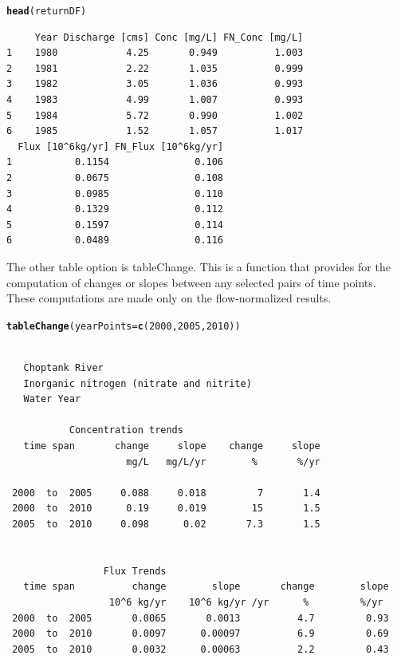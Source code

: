 \documentclass[a4paper,11pt]{article}\usepackage[]{graphicx}\usepackage[]{color}
\makeatletter
\newcommand{\hlnum}[1]{\textcolor[rgb]{0.686,0.059,0.569}{#1}}%
\newcommand{\hlstd}[1]{\textcolor[rgb]{0.345,0.345,0.345}{#1}}%
\newcommand{\hlkwc}[1]{\textcolor[rgb]{0.333,0.667,0.333}{#1}}%
\newcommand{\hlkwd}[1]{\textcolor[rgb]{0.737,0.353,0.396}{\textbf{#1}}}%
\newenvironment{kframe}{%
 \def\at@end@of@kframe{}%
 \ifinner\ifhmode%
  \def\at@end@of@kframe{\end{minipage}}%
  \begin{minipage}{\columnwidth}%
 \fi\fi%
 \def\FrameCommand##1{\hskip\@totalleftmargin \hskip-\fboxsep
 \colorbox{shadecolor}{##1}\hskip-\fboxsep
     \hskip-\linewidth \hskip-\@totalleftmargin \hskip\columnwidth}%
 \MakeFramed {\advance\hsize-\width
   \@totalleftmargin\z@ \linewidth\hsize
   \@setminipage}}%
 {\par\unskip\endMakeFramed%
 \at@end@of@kframe}
\newenvironment{knitrout}{}{} %
\makeatother
\begin{document}
\begin{knitrout}
\color{fgcolor}\begin{kframe}
\begin{alltt}
\hlkwd{head}\hlstd{(returnDF)}
\end{alltt}
\begin{verbatim}
     Year Discharge [cms] Conc [mg/L] FN_Conc [mg/L]
1    1980            4.25       0.949          1.003
2    1981            2.22       1.035          0.999
3    1982            3.05       1.036          0.993
4    1983            4.99       1.007          0.993
5    1984            5.72       0.990          1.002
6    1985            1.52       1.057          1.017
  Flux [10^6kg/yr] FN_Flux [10^6kg/yr]
1           0.1154               0.106
2           0.0675               0.108
3           0.0985               0.110
4           0.1329               0.112
5           0.1597               0.114
6           0.0489               0.116
\end{verbatim}
\end{kframe}
\end{knitrout}



The other table option is tableChange. This is a function that provides for the computation of changes or slopes between any selected pairs of time points.  These computations are made only on the flow-normalized results.

\begin{knitrout}
\color{fgcolor}\begin{kframe}
\begin{alltt}
\hlkwd{tableChange}\hlstd{(}\hlkwc{yearPoints}\hlstd{=}\hlkwd{c}\hlstd{(}\hlnum{2000}\hlstd{,}\hlnum{2005}\hlstd{,}\hlnum{2010}\hlstd{))}
\end{alltt}
\begin{verbatim}

   Choptank River 
   Inorganic nitrogen (nitrate and nitrite)
   Water Year 

           Concentration trends
   time span       change     slope    change     slope
                     mg/L   mg/L/yr        %       %/yr

 2000  to  2005     0.088     0.018         7       1.4
 2000  to  2010      0.19     0.019        15       1.5
 2005  to  2010     0.098      0.02       7.3       1.5


                 Flux Trends
   time span          change        slope       change        slope
                  10^6 kg/yr    10^6 kg/yr /yr      %         %/yr
 2000  to  2005       0.0065       0.0013          4.7         0.93
 2000  to  2010       0.0097      0.00097          6.9         0.69
 2005  to  2010       0.0032      0.00063          2.2         0.43
\end{verbatim}
\end{kframe}
\end{knitrout}
\end{document}
